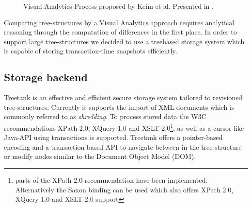 \begin{figure}[htb]
\caption{\label{fig:visualanalyticsprocess} Visual Analytics Process proposed by Keim et al. Presented in \cite{keim2008visual}.}
\end{figure}


Comparing tree-structures by a Visual Analytics approach requires analytical reasoning through the computation of differences in the first place. In order to support large tree-structures we decided to use a treebased storage system which is capable of storing transaction-time snapshots efficiently.

\subsection{Storage backend}
Treetank\cite{TREETANK} is an effective and efficient secure storage system tailored to revisioned tree-structures. Currently it supports the import of XML documents which is commonly referred to as \emph{shredding}. To process stored data the W3C recommendations XPath 2.0, XQuery 1.0 and XSLT 2.0\footnote{parts of the XPath 2.0 recommendation have been implemented. Alternatively the Saxon binding can be used which also offers XPath 2.0, XQuery 1.0 and XSLT 2.0 support}, as well as a cursor like Java-API using transactions is supported. Treetank offers a pointer-based encoding and a transaction-based API to navigate between in the tree-structure or modify nodes similar to the Document Object Model (DOM\cite{DOM}).

